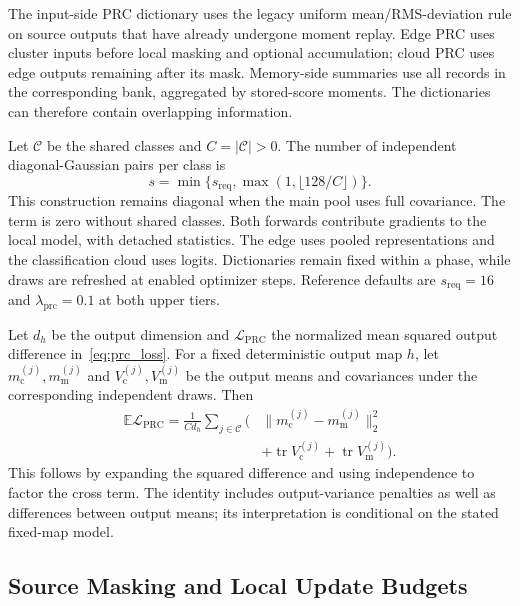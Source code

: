 The input-side PRC dictionary uses the legacy uniform mean/RMS-deviation rule on source outputs that have already undergone moment replay. Edge PRC uses cluster inputs before local masking and optional accumulation; cloud PRC uses edge outputs remaining after its mask. Memory-side summaries use all records in the corresponding bank, aggregated by stored-score moments. The dictionaries can therefore contain overlapping information.

Let $\mathcal C$ be the shared classes and $C=|\mathcal C|>0$. The number of independent diagonal-Gaussian pairs per class is
\begin{equation}
 s=\min\{s_{\mathrm{req}},\max(1,\lfloor128/C\rfloor)\}.
\label{eq:supp_prc_draw_count}
\end{equation}
This construction remains diagonal when the main pool uses full covariance. The term is zero without shared classes. Both forwards contribute gradients to the local model, with detached statistics. The edge uses pooled representations and the classification cloud uses logits. Dictionaries remain fixed within a phase, while draws are refreshed at enabled optimizer steps. Reference defaults are $s_{\mathrm{req}}=16$ and $\lambda_{\mathrm{prc}}=0.1$ at both upper tiers.

Let $d_h$ be the output dimension and $\mathcal L_{\mathrm{PRC}}$ the normalized mean squared output difference in~\eqref{eq:prc_loss}. For a fixed deterministic output map $h$, let $m_{\mathrm c}^{(j)},m_{\mathrm m}^{(j)}$ and $V_{\mathrm c}^{(j)},V_{\mathrm m}^{(j)}$ be the output means and covariances under the corresponding independent draws. Then
\begin{equation}
\begin{split}
 \mathbb E\mathcal L_{\mathrm{PRC}}
 =\frac{1}{Cd_h}\sum_{j\in\mathcal C}
 \bigl(&\|m_{\mathrm c}^{(j)}-m_{\mathrm m}^{(j)}\|_2^2\\
 &+\operatorname{tr}V_{\mathrm c}^{(j)}
 +\operatorname{tr}V_{\mathrm m}^{(j)}\bigr).
\end{split}
\label{eq:supp_prc_decomp}
\end{equation}
This follows by expanding the squared difference and using independence to factor the cross term. The identity includes output-variance penalties as well as differences between output means; its interpretation is conditional on the stated fixed-map model.

\subsection{Source Masking and Local Update Budgets}

